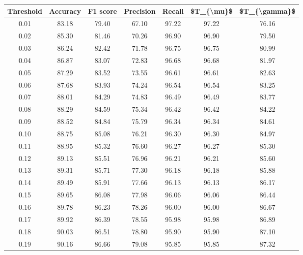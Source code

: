 \begin{tabular}{|c|c|c|c|c|c|c|}
\hline
 Threshold &  Accuracy &  F1 score &  Precision &  Recall &  \$T\_\{\textbackslash mu\}\$ &  \$T\_\{\textbackslash gamma\}\$ \\
\hline
      0.01 &     83.18 &     79.40 &      67.10 &   97.22 &      97.22 &         76.16 \\
      0.02 &     85.30 &     81.46 &      70.26 &   96.90 &      96.90 &         79.50 \\
      0.03 &     86.24 &     82.42 &      71.78 &   96.75 &      96.75 &         80.99 \\
      0.04 &     86.87 &     83.07 &      72.83 &   96.68 &      96.68 &         81.97 \\
      0.05 &     87.29 &     83.52 &      73.55 &   96.61 &      96.61 &         82.63 \\
      0.06 &     87.68 &     83.93 &      74.24 &   96.54 &      96.54 &         83.25 \\
      0.07 &     88.01 &     84.29 &      74.83 &   96.49 &      96.49 &         83.77 \\
      0.08 &     88.29 &     84.59 &      75.34 &   96.42 &      96.42 &         84.22 \\
      0.09 &     88.52 &     84.84 &      75.79 &   96.34 &      96.34 &         84.61 \\
      0.10 &     88.75 &     85.08 &      76.21 &   96.30 &      96.30 &         84.97 \\
      0.11 &     88.95 &     85.32 &      76.60 &   96.27 &      96.27 &         85.30 \\
      0.12 &     89.13 &     85.51 &      76.96 &   96.21 &      96.21 &         85.60 \\
      0.13 &     89.31 &     85.71 &      77.30 &   96.18 &      96.18 &         85.88 \\
      0.14 &     89.49 &     85.91 &      77.66 &   96.13 &      96.13 &         86.17 \\
      0.15 &     89.65 &     86.08 &      77.98 &   96.06 &      96.06 &         86.44 \\
      0.16 &     89.78 &     86.23 &      78.26 &   96.00 &      96.00 &         86.67 \\
      0.17 &     89.92 &     86.39 &      78.55 &   95.98 &      95.98 &         86.89 \\
      0.18 &     90.03 &     86.51 &      78.80 &   95.90 &      95.90 &         87.10 \\
      0.19 &     90.16 &     86.66 &      79.08 &   95.85 &      95.85 &         87.32 \\

\end{tabular}

